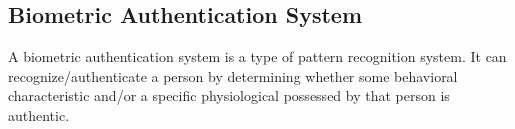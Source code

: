 



\subsection{Biometric Authentication System}
A biometric authentication system is a type of pattern recognition system. It can recognize/authenticate a person by
determining whether some behavioral characteristic and/or a specific physiological
possessed by that person is authentic.\cite{Maltoni2003}

